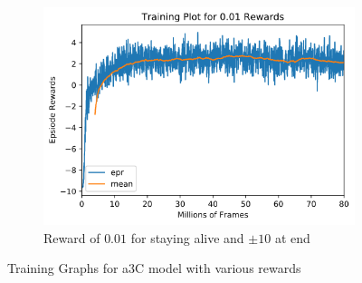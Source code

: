 \begin{figure}[ht!]
    \begin{subfigure}{0.49\textwidth}
        \centering
        \includegraphics[width=\textwidth]{figures/a3c-training-0-01.png}
        \caption{Reward of $0.01$ for staying alive and $\pm 10$ at end}
        \label{fig:training-a3c-01}
    \end{subfigure}
    \caption{Training Graphs for a3C model with various rewards}
    \label{fig:a3c-training}
\end{figure}

